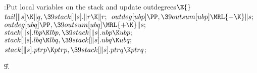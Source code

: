 \B{}:Put local variables on the stack and update
outdegrees\X${}\E{}$\6
$\\{tail}[\|s]\K\|q,\39\\{stack}[\|s].\|r\K\|r;{}$\6
${}\\{outdeg}[\\{ubp}]\PP,\39\\{outsum}[\\{ubp}]\MRL{+{\K}}\|s;{}$\6
${}\\{outdeg}[\\{ubq}]\PP,\39\\{outsum}[\\{ubq}]\MRL{+{\K}}\|s;{}$\6
${}\\{stack}[\|s].\\{lbp}\K\\{lbp},\39\\{stack}[\|s].\\{ubp}\K\\{ubp};{}$\6
${}\\{stack}[\|s].\\{lbq}\K\\{lbq},\39\\{stack}[\|s].\\{ubq}\K\\{ubq};{}$\6
${}\\{stack}[\|s].\\{ptrp}\K\\{ptrp},\39\\{stack}[\|s].\\{ptrq}\K\\{ptrq}{}$;%
\par
\U9.\fi

